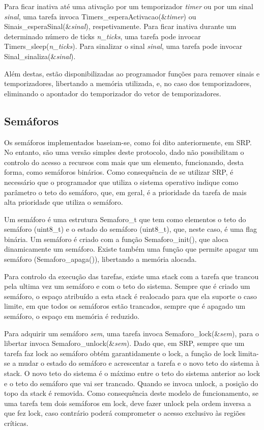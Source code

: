 \documentclass[journal]{IEEEtran}
\begin{document}
Para ficar inativa até uma ativação por um temporizador \emph{timer} ou por um sinal \emph{sinal}, uma tarefa invoca Timers\_esperaActivacao(\&\emph{timer}) ou
Sinais\_esperaSinal(\&\emph{sinal}), respetivamente.
Para ficar inativa durante um determinado número de ticks \emph{n\_ticks}, uma tarefa pode invocar Timers\_sleep(\emph{n\_ticks}).
Para sinalizar o sinal \emph{sinal}, uma tarefa pode invocar Sinal\_sinaliza(\&\emph{sinal}).

Além destas, estão disponibilizadas ao programador funções para remover sinais e temporizadores, libertando a memória utilizada, e, no caso dos temporizadores, eliminando
o apontador do temporizador do vetor de temporizadores.

\subsection{Semáforos}
Os semáforos implementados baseiam-se, como foi dito anteriormente, em SRP.
No entanto, são uma versão simples deste protocolo, dado não possibilitam o controlo do acesso a recursos com mais que um elemento, funcionando, desta forma, como
semáforos binários.
Como consequência de se utilizar SRP, é necessário que o programador que utiliza o sistema operativo indique como parâmetro o teto do semáforo, que, em geral, é a
prioridade da tarefa de mais alta prioridade que utiliza o semáforo.

Um semáforo é uma estrutura Semaforo\_t que tem como elementos o teto do semáforo (uint8\_t) e o estado do semáforo (uint8\_t), que, neste caso, é uma flag binária.
Um semáforo é criado com a função Semaforo\_init(), que aloca dinamicamente um semáforo.
Existe também uma função que permite apagar um semáforo (Semaforo\_apaga()), libertando a memória alocada.

Para controlo da execução das tarefas, existe uma stack com a tarefa que trancou pela ultima vez um semáforo e com o teto do sistema.
Sempre que é criado um semáforo, o espaço atribuído a esta stack é realocado para que ela suporte o caso limite, em que todos os semáforos estão trancados, sempre que é
apagado um semáforo, o espaço em memória é reduzido.

Para adquirir um semáforo \emph{sem}, uma tarefa invoca Semaforo\_lock(\&\emph{sem}), para o libertar invoca Semaforo\_unlock(\&\emph{sem}).
Dado que, em SRP, sempre que um tarefa faz lock ao semáforo obtém garantidamente o lock, a função de lock limita-se a mudar o estado do semáforo e acrescentar a tarefa e
o novo teto do sistema à stack.
O novo teto do sistema é o máximo entre o teto do sistema anterior ao lock e o teto do semáforo que vai ser trancado.
Quando se invoca unlock, a posição do topo da stack é removida.
Como consequência deste modelo de funcionamento, se uma tarefa tem dois semáforos em lock, deve fazer unlock pela ordem inversa a que fez lock, caso contrário poderá
comprometer o acesso exclusivo às regiões críticas.
\end{document}
